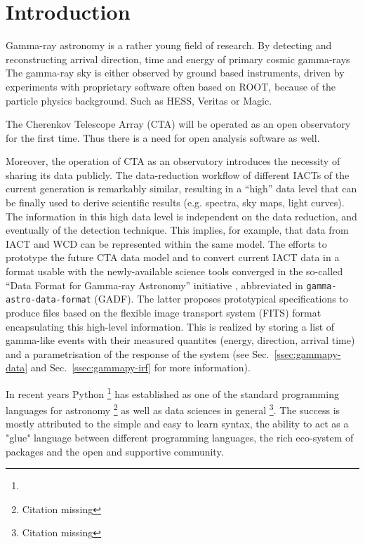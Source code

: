 \section{Introduction}
\label{sec:introduction}


Gamma-ray astronomy is a rather young field of research. By detecting and
reconstructing arrival direction, time and energy of primary cosmic gamma-rays
The gamma-ray sky is either observed by ground based instruments, driven by
experiments with proprietary software often based on ROOT, because of the
particle physics background. Such as HESS, Veritas or Magic.

The Cherenkov Telescope Array (CTA) will be operated as an open observatory for the
first time. Thus there is a need for open analysis software as well.

Moreover, the operation of CTA as an observatory introduces the necessity of sharing
its data publicly. The data-reduction workflow of different IACTs of the current
generation is remarkably similar, resulting in a ``high'' data level that can be
finally used to derive scientific results (e.g. spectra, sky maps, light curves).
The information in this high data level is independent on the data reduction,
and eventually of the detection technique. This implies, for example, that data
from IACT and WCD can be represented within the same model.
The efforts to prototype the future CTA data model and to convert current IACT
data in a format usable with the newly-available science tools converged in the
so-called ``Data Format for Gamma-ray Astronomy'' initiative
\citep{gadf_proc, gadf_universe}, abbreviated in \texttt{gamma-astro-data-format}
(GADF). The latter proposes prototypical specifications to produce files based
on the flexible image transport system (FITS) format \citep{fits} encapsulating
this high-level information. This is realized by storing a list of gamma-like
events with their measured quantites (energy, direction, arrival time) and a
parametrisation of the response of the system (see Sec.~\ref{ssec:gammapy-data}
and Sec.~\ref{ssec:gammapy-irf} for more information).

In recent years Python \footnote{\PythonUrl} has established as one of the
standard programming  languages for astronomy \footnote{Citation missing} as
well as data sciences in  general \footnote{Citation missing}. The success is
mostly attributed to the simple and easy to learn syntax, the ability to act as
a "glue" language between different programming languages, the rich eco-system
of packages and the open and supportive community.

